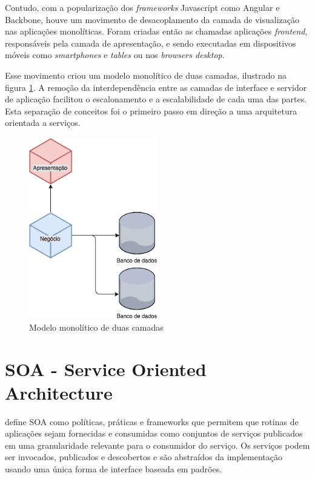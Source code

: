 Contudo, com a popularização dos \textit{frameworks} Javascript como Angular e Backbone, houve um movimento de desacoplamento da camada de visualização nas aplicações monolíticas. Foram criadas então as chamadas aplicações \textit{frontend}, responsáveis pela camada de apresentação, e sendo executadas em dispositivos móveis como \textit{smartphones} e \textit{tables} ou nos \textit{browsers desktop}. 

Esse movimento criou um modelo monolítico de duas camadas, ilustrado na figura \ref{fig:two-tier-monolithic}. A remoção da interdependência entre as camadas de interface e servidor de aplicação facilitou o escalonamento e a escalabilidade de cada uma das partes. Esta separação de conceitos foi o primeiro passo em direção a uma arquitetura orientada a serviços.

\begin{figure}[htbp]
    \centering
    \includegraphics[width=0.5\textwidth]{figuras/two-tier-monolithic.png}
    \caption{Modelo monolítico de duas camadas}
    \label{fig:two-tier-monolithic}
\end{figure}

\section{SOA - Service Oriented Architecture}\label{sec:soa}

 define SOA como políticas, práticas e frameworks que permitem que rotinas de aplicações sejam fornecidas e consumidas como conjuntos de serviços publicados em uma granularidade relevante para o consumidor do serviço. Os serviços podem ser invocados, publicados e descobertos e são abstraídos da implementação usando uma única forma de interface baseada em padrões.

